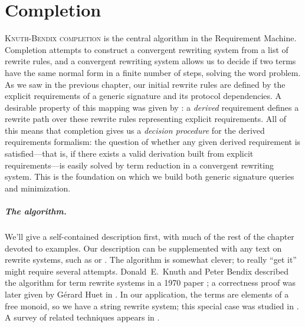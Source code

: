 \documentclass[../generics]{subfiles}
\begin{document}
\chapter{Completion}\label{completion}

%
\lettrine{K}{nuth-Bendix completion} is the central algorithm in the Requirement Machine. Completion attempts to construct a convergent rewriting system from a list of rewrite rules, and a convergent rewriting system allows us to decide if two terms have the same normal form in a finite number of steps, solving the word problem. As we saw in the previous chapter, our initial rewrite rules are defined by the explicit requirements of a generic signature and its protocol dependencies. A desirable property of this mapping was given by : a \emph{derived} requirement defines a rewrite path over these rewrite rules representing explicit requirements. All of this means that completion gives us a \emph{decision procedure} for the derived requirements formalism: the question of whether any given derived requirement is satisfied---that is, if there exists a valid derivation built from explicit requirements---is easily solved by term reduction in a convergent rewriting system. This is the foundation on which we build both generic signature queries and minimization.

\paragraph{The algorithm.} We'll give a self-contained description first, with much of the rest of the chapter devoted to examples. Our description can be supplemented with any text on rewrite systems, such as \cite{book2012string} or \cite{andallthat}. The algorithm is somewhat clever; to really ``get it'' might require several attempts. Donald~E.~Knuth and Peter Bendix described the algorithm for term rewrite systems in a 1970 paper \cite{Knuth1983}; a correctness proof was later given by G\'erard Huet in \cite{HUET198111}. In our application, the terms are elements of a free monoid, so we have a string rewrite system; this special case was studied in \cite{narendran}. A survey of related techniques appears in \cite{BUCHBERGER19873}.
\end{document}
